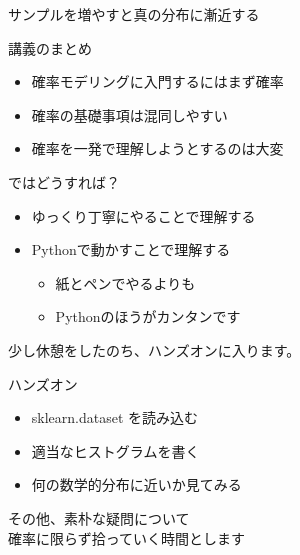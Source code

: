 \documentclass[dvipdfmx,cjk]{beamer}
\begin{document}
\begin{frame}{サンプルを増やすと真の分布に漸近する}


\end{frame}



\begin{frame}{講義のまとめ}

\begin{itemize}
    \item 確率モデリングに入門するにはまず確率
    \item 確率の基礎事項は混同しやすい
    \item 確率を一発で理解しようとするのは大変
\end{itemize}

\vskip 1cm
ではどうすれば？

\begin{itemize}
    \item ゆっくり丁寧にやることで理解する
    \item Pythonで動かすことで理解する
        \begin{itemize}
        \item 紙とペンでやるよりも
        \item Pythonのほうがカンタンです
        \end{itemize}
\end{itemize}

\vskip 1cm
少し休憩をしたのち、ハンズオンに入ります。

\end{frame}


\begin{frame}{ハンズオン}

\begin{itemize}
    \item sklearn.dataset を読み込む
    \item 適当なヒストグラムを書く
    \item 何の数学的分布に近いか見てみる
\end{itemize}

\vskip 1cm
その他、素朴な疑問について\\確率に限らず拾っていく時間とします

\end{frame}


\end{document}
